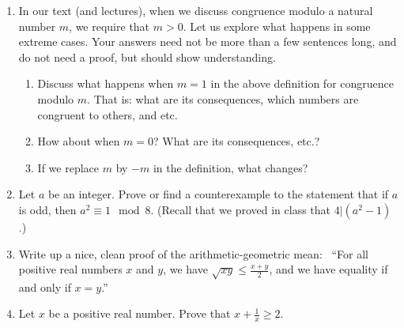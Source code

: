 \documentclass[12pt]{article}
\begin{document}
\begin{enumerate}  %


\item In our text (and lectures), when we discuss congruence modulo a natural number $m$, we require that $m>0$.
  Let us explore what happens in some extreme cases.
  Your answers need not be more than a few sentences long, and do not need a proof, but should show understanding.
  
  \begin{enumerate}
  \item Discuss what happens when $m=1$ in the above definition for congruence modulo $m$.
        That is: what are its consequences, which numbers are congruent to others, and etc.

  \item How about when $m=0$?   What are its consequences, etc.?


  \item If we replace $m$ by $-m$ in the definition, what changes?

  \end{enumerate}    

\item Let $a$ be an integer.   Prove or find a counterexample to the statement that if $a$ is odd, then $a^2 \equiv 1 \mod 8$.
      (Recall that we proved in class that $4|(a^2-1)$.)

\item Write up a nice, clean proof of the arithmetic-geometric mean: \ 
  ``For all positive real numbers $x$ and $y$,  we have $\sqrt{xy}\leq \frac{x+y}{2}$, and we have equality if and only if $x=y$.''

\item Let $x$ be a positive real number.
  Prove that $x+\frac{1}{x} \geq 2$.


\end{enumerate}
\end{document}
